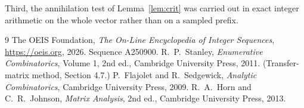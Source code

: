 \documentclass[11pt,a4paper]{article}
\theoremstyle{plain}
\theoremstyle{definition}
\begin{document}
Third, the annihilation test of Lemma~\ref{lem:crit} was carried out in exact integer
arithmetic on the whole vector rather than on a sampled prefix.

\begin{thebibliography}{9}
 The OEIS Foundation, \emph{The On-Line Encyclopedia of Integer
Sequences}, \url{https://oeis.org}, 2026. Sequence A250900.
 R.~P.~Stanley, \emph{Enumerative Combinatorics}, Volume 1, 2nd ed.,
Cambridge University Press, 2011. (Transfer-matrix method, Section 4.7.)
 P.~Flajolet and R.~Sedgewick, \emph{Analytic Combinatorics}, Cambridge
University Press, 2009.
 R.~A.~Horn and C.~R.~Johnson, \emph{Matrix Analysis}, 2nd ed., Cambridge
University Press, 2013.
\end{thebibliography}
\end{document}
